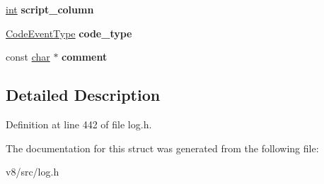 \begin{DoxyCompactItemize}
\mbox{\hyperlink{classint}{int}} {\bfseries script\+\_\+column}
\item 
\mbox{\label{structv8_1_1internal_1_1CodeEvent_a93fc36d26e69aa7c57b5cc867cad608f}} 
\mbox{\hyperlink{namespacev8_af0ff31131cc32ced9b5279b321569bbc}{Code\+Event\+Type}} {\bfseries code\+\_\+type}
\item 
\mbox{\label{structv8_1_1internal_1_1CodeEvent_ad6f1ced6468c8476b0f6bbe81cf2440b}} 
const \mbox{\hyperlink{classchar}{char}} $\ast$ {\bfseries comment}
\end{DoxyCompactItemize}


\subsection{Detailed Description}


Definition at line 442 of file log.\+h.



The documentation for this struct was generated from the following file\+:\begin{DoxyCompactItemize}
\item 
v8/src/log.\+h\end{DoxyCompactItemize}
